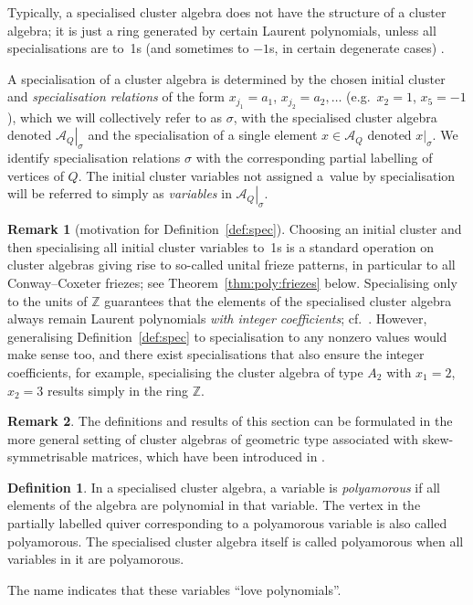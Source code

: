 \documentclass[12pt]{article}
\theoremstyle{definition}
\newtheorem{definition}{Definition}
\newtheorem{remark}{Remark}
\newcommand{\Z}{\mathbb{Z}}
\newcommand{\sA}{\left.\mathcal{A}_Q\right|_\sigma}
\begin{document}
Typically, a specialised cluster algebra does not have the structure of a cluster algebra; it is just a ring generated by certain Laurent polynomials, unless all specialisations are to~1s (and sometimes to $-1$s, in certain degenerate cases) \cite[Lemma 6.6]{OnCatCA}.

A specialisation of a cluster algebra is determined by the chosen initial cluster and \emph{specialisation relations} of the form $x_{j_1}=a_1$, $x_{j_2}=a_2,\ldots$ (e.g.\ $x_2=1$, $x_5=-1$), which we will collectively refer to as $\sigma$, with the specialised cluster algebra denoted $\sA$ and the specialisation of a single element $x\in\mathcal{A}_Q$ denoted $x|_\sigma$. We identify specialisation relations $\sigma$ with the corresponding partial labelling of vertices of $Q$. The initial cluster variables not assigned a~value by specialisation will be referred to simply as \emph{variables} in $\sA$.

\begin{remark}[motivation for Definition~\ref{def:spec}]
Choosing an initial cluster and then specialising all initial cluster variables to~1s is a standard operation on cluster algebras giving rise to so-called unital frieze patterns, in particular to all Conway--Coxeter friezes; see Theorem~\ref{thm:poly:friezes} below. Specialising only to the units of $\Z$ guarantees that the elements of the specialised cluster algebra always remain Laurent polynomials \emph{with integer coefficients}; cf.\ \cite[Remark 2.2]{GunawanSchiffler}. However, generalising Definition~\ref{def:spec} to specialisation to any nonzero values would make sense too, and there exist specialisations that also ensure the integer coefficients, for example, specialising the cluster algebra of type $A_2$ with $x_1=2$, $x_2=3$ results simply in the ring $\Z$.
\end{remark}
\begin{remark}
The definitions and results of this section can be formulated in the more general setting of cluster algebras of geometric type associated with skew-symmetrisable matrices, which have been introduced in \cite{CA1}.
\end{remark}

\begin{definition}
In a specialised cluster algebra, a variable is \emph{polyamorous} if all elements of the algebra are polynomial in that variable. The vertex in the partially labelled quiver corresponding to a polyamorous variable is also called polyamorous. The specialised cluster algebra itself is called polyamorous when all variables in it are polyamorous.
\end{definition}
The name indicates that these variables ``love polynomials''.
\end{document}
